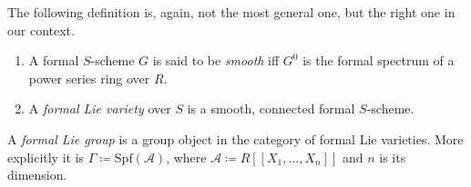 \documentclass[../Main]{subfiles}
\begin{document}
The following definition is, again, not the most general one, but
the right one in our context.
\begin{defn}\leavevmode\vspace{-1\baselineskip}
\begin{enumerate}
	\item A formal $S$-scheme $G$ is said to be {\em smooth} iff
		$G^0$ is the formal spectrum of a power series ring over $R$.
	\item A {\em formal Lie variety} over $S$ is a smooth, connected formal $S$-scheme.
\end{enumerate}
\end{defn}

\begin{defn}
	A {\em formal Lie group} is a group object in the category of
	formal Lie varieties.
	More explicitly it is $\Gamma \coloneqq \mathrm{Spf}\left( \mathscr{A} \right)$,
	where $\mathscr{A} \coloneqq R [\![ X_1, \ldots, X_{ n } ]\!]$
	and $n$ is its dimension. 
\end{defn}
\end{document}
